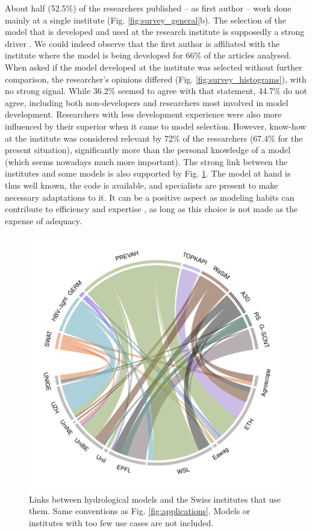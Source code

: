 \documentclass[10pt,a4paper]{article}
\begin{document}
About half (52.5\%) of the researchers published -- as first author -- work done mainly at a single institute (Fig. \ref{fig:survey_general}b). The selection of the model that is developed and used at the research institute is supposedly a strong driver \citep{Addor2019}. We could indeed observe that the first author is affiliated with the institute where the model is being developed for 66\% of the articles analysed. When asked if the model developed at the institute was selected without further comparison, the researcher's opinions differed (Fig. \ref{fig:survey_histograms}), with no strong signal. While 36.2\% seemed to agree with that statement, 44.7\% do not agree, including both non-developers and researchers most involved in model development. Researchers with less development experience were also more influenced by their superior when it came to model selection. However, know-how at the institute was considered relevant by 72\% of the researchers (67.4\% for the present situation), significantly more than the personal knowledge of a model (which seems nowadays much more important). The strong link between the institutes and some models is also supported by Fig. \ref{fig:model-institutes}. The model at hand is thus well known, the code is available, and specialists are present to make necessary adaptations to it. It can be a positive aspect as modeling habits can contribute to efficiency and expertise \citep{Babel2019}, as long as this choice is not made as the expense of adequacy.


\begin{figure}[htb]
	\begin{center}
		\includegraphics[width=0.70\columnwidth]{figures/chord_diagram_institutes}
		\caption{{Links between hydrological models and the Swiss institutes that use them. Same conventions as Fig. \ref{fig:applications}. Models or institutes with too few use cases are not included.
		{\label{fig:model-institutes}}
		}}
	\end{center}
\end{figure}
\end{document}
